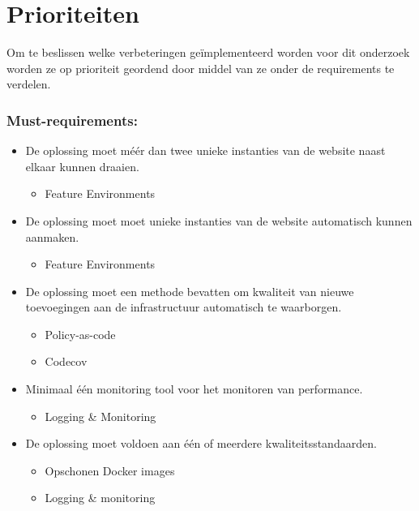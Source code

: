 \section{Prioriteiten}
Om te beslissen welke verbeteringen geïmplementeerd worden voor dit onderzoek worden ze op prioriteit geordend door middel van ze onder de requirements te verdelen.


\subsubsection{Must-requirements:}
\begin{itemize}
	\item De oplossing moet méér dan twee unieke instanties van de website naast elkaar kunnen draaien.
	\begin{itemize}
		\item Feature Environments
	\end{itemize}
	
	\item De oplossing moet moet unieke instanties van de website automatisch kunnen aanmaken.
	\begin{itemize}
		\item Feature Environments
	\end{itemize}

	\item De oplossing moet een methode bevatten om kwaliteit van nieuwe toevoegingen aan de infrastructuur automatisch te waarborgen.
	\begin{itemize}
		\item Policy-as-code
		\item Codecov
	\end{itemize}

	\item Minimaal één monitoring tool voor het monitoren van performance.
	\begin{itemize}
		\item Logging \& Monitoring
	\end{itemize}

	\item De oplossing moet voldoen aan één of meerdere kwaliteitsstandaarden.
	\begin{itemize}
		\item Opschonen Docker images
		\item Logging \& monitoring
	\end{itemize}
\end{itemize}

